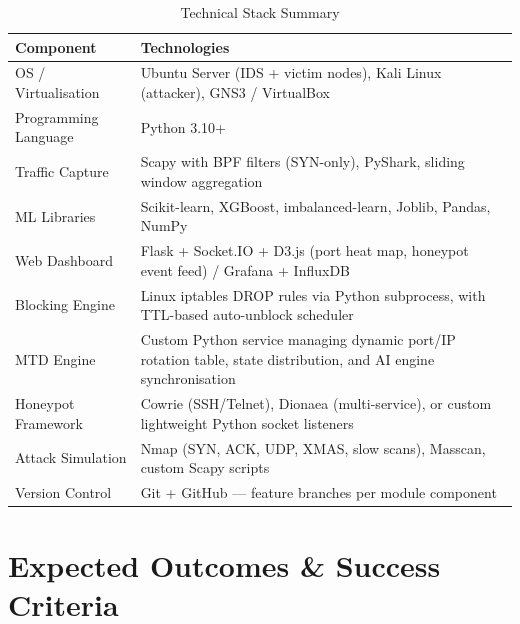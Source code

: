 \documentclass[12pt,a4paper]{report}
\begin{document}
\begin{table}[h!]
\centering
\caption{Technical Stack Summary}
\begin{tabular}{@{}L{4cm} L{11cm}@{}}
  \toprule
  \textbf{Component} & \textbf{Technologies} \\
  \midrule
  OS / Virtualisation
    & Ubuntu Server (IDS + victim nodes), Kali Linux (attacker), GNS3 / VirtualBox \\
  Programming Language    & Python 3.10+ \\
  Traffic Capture
    & Scapy with BPF filters (SYN-only), PyShark, sliding window aggregation \\
  ML Libraries
    & Scikit-learn, XGBoost, imbalanced-learn, Joblib, Pandas, NumPy \\
  Web Dashboard
    & Flask + Socket.IO + D3.js (port heat map, honeypot event feed) / Grafana + InfluxDB \\
  Blocking Engine
    & Linux iptables DROP rules via Python subprocess, with TTL-based auto-unblock scheduler \\
  MTD Engine
    & Custom Python service managing dynamic port/IP rotation table, state distribution,
      and AI engine synchronisation \\
  Honeypot Framework
    & Cowrie (SSH/Telnet), Dionaea (multi-service), or custom lightweight Python socket
      listeners \\
  Attack Simulation
    & Nmap (SYN, ACK, UDP, XMAS, slow scans), Masscan, custom Scapy scripts \\
  Version Control         & Git + GitHub --- feature branches per module component \\
  \bottomrule
\end{tabular}
\label{tab:stack}
\end{table}

\chapter{Expected Outcomes \& Success Criteria}
\end{document}
